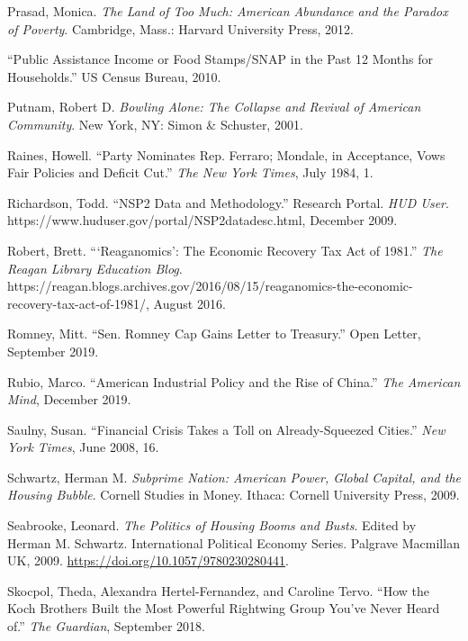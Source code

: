 \documentclass[12pt,oneside]{psthesis}
\begin{document}
\leavevmode\hypertarget{ref-prasad2012land}{}%
Prasad, Monica. \emph{The Land of Too Much: American Abundance and the Paradox of Poverty}. Cambridge, Mass.: Harvard University Press, 2012.

\leavevmode\hypertarget{ref-2010public}{}%
``Public Assistance Income or Food Stamps/SNAP in the Past 12 Months for Households.'' US Census Bureau, 2010.

\leavevmode\hypertarget{ref-putnam2001bowling}{}%
Putnam, Robert D. \emph{Bowling Alone: The Collapse and Revival of American Community}. New York, NY: Simon \& Schuster, 2001.

\leavevmode\hypertarget{ref-raines1984party}{}%
Raines, Howell. ``Party Nominates Rep. Ferraro; Mondale, in Acceptance, Vows Fair Policies and Deficit Cut.'' \emph{The New York Times}, July 1984, 1.

\leavevmode\hypertarget{ref-richardson2009nsp2}{}%
Richardson, Todd. ``NSP2 Data and Methodology.'' Research Portal. \emph{HUD User}. https://www.huduser.gov/portal/NSP2datadesc.html, December 2009.

\leavevmode\hypertarget{ref-robert2016reaganomics}{}%
Robert, Brett. ```Reaganomics': The Economic Recovery Tax Act of 1981.'' \emph{The Reagan Library Education Blog}. https://reagan.blogs.archives.gov/2016/08/15/reaganomics-the-economic-recovery-tax-act-of-1981/, August 2016.

\leavevmode\hypertarget{ref-romney2019sen}{}%
Romney, Mitt. ``Sen. Romney Cap Gains Letter to Treasury.'' Open Letter, September 2019.

\leavevmode\hypertarget{ref-rubio2019american}{}%
Rubio, Marco. ``American Industrial Policy and the Rise of China.'' \emph{The American Mind}, December 2019.

\leavevmode\hypertarget{ref-saulny2008financial}{}%
Saulny, Susan. ``Financial Crisis Takes a Toll on Already-Squeezed Cities.'' \emph{New York Times}, June 2008, 16.

\leavevmode\hypertarget{ref-schwartz2009subprime}{}%
Schwartz, Herman M. \emph{Subprime Nation: American Power, Global Capital, and the Housing Bubble}. Cornell Studies in Money. Ithaca: Cornell University Press, 2009.

\leavevmode\hypertarget{ref-seabrooke2009politics}{}%
Seabrooke, Leonard. \emph{The Politics of Housing Booms and Busts}. Edited by Herman M. Schwartz. International Political Economy Series. Palgrave Macmillan UK, 2009. \url{https://doi.org/10.1057/9780230280441}.

\leavevmode\hypertarget{ref-skocpol2018how}{}%
Skocpol, Theda, Alexandra Hertel-Fernandez, and Caroline Tervo. ``How the Koch Brothers Built the Most Powerful Rightwing Group You've Never Heard of.'' \emph{The Guardian}, September 2018.
\end{document}
